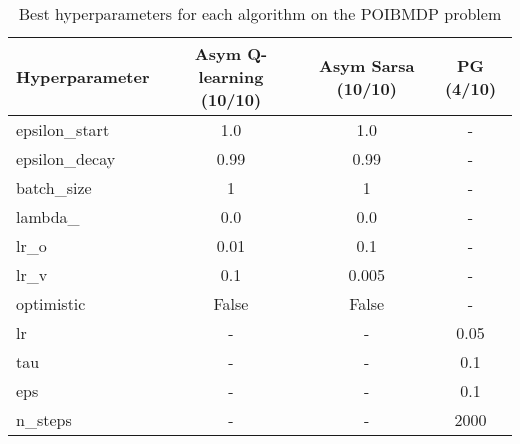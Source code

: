 \begin{table}
    \centering
    \begin{tabular}{|l|c|c|c|}
    \textbf{Hyperparameter} & \textbf{Asym Q-learning (10/10)} & \textbf{Asym Sarsa (10/10)} & \textbf{PG (4/10)} \\
    \toprule
    epsilon\_start & 1.0 & 1.0 & - \\
    epsilon\_decay & 0.99 & 0.99 & - \\
    batch\_size & 1 & 1 & - \\
    lambda\_ & 0.0 & 0.0 & - \\
    lr\_o & 0.01 & 0.1 & - \\
    lr\_v & 0.1 & 0.005 & - \\
    optimistic & False & False & - \\
    lr & - & - & 0.05 \\
    tau & - & - & 0.1 \\
    eps & - & - & 0.1 \\
    n\_steps & - & - & 2000 \\
    \bottomrule
    \end{tabular}
    \caption{Best hyperparameters for each algorithm on the POIBMDP problem}
    \label{tab:algorithm-hyperparameters}
    \end{table}
